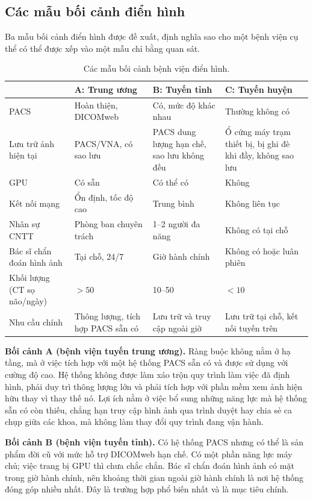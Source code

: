 \subsection{Các mẫu bối cảnh điển hình}

Ba mẫu bối cảnh điển hình được đề xuất, định nghĩa sao cho một bệnh viện cụ thể
có thể được xếp vào một mẫu chỉ bằng quan sát.

\begin{table}[H]
\centering
\small
\begin{tabularx}{\textwidth}{@{}l X X X@{}}
\toprule
 & \textbf{A: Trung ương} & \textbf{B: Tuyến tỉnh} & \textbf{C: Tuyến huyện} \\
\midrule
PACS & Hoàn thiện, DICOMweb & Có, mức độ khác nhau & Thường không có \\
Lưu trữ ảnh hiện tại & PACS/VNA, có sao lưu & PACS dung lượng hạn chế, sao lưu không đều & Ổ cứng máy trạm thiết bị, bị ghi đè khi đầy, không sao lưu \\
GPU & Có sẵn & Có thể có & Không \\
Kết nối mạng & Ổn định, tốc độ cao & Trung bình & Không liên tục \\
Nhân sự CNTT & Phòng ban chuyên trách & 1--2 người đa năng & Không có tại chỗ \\
Bác sĩ chẩn đoán hình ảnh & Tại chỗ, 24/7 & Giờ hành chính & Không có hoặc luân phiên \\
Khối lượng (CT sọ não/ngày) & $>50$ & 10--50 & $<10$ \\
Nhu cầu chính & Thông lượng, tích hợp PACS sẵn có & Lưu trữ và truy cập ngoài giờ & Lưu trữ tại chỗ, kết nối tuyến trên \\
\bottomrule
\end{tabularx}
\caption{Các mẫu bối cảnh bệnh viện điển hình.}
\label{tab:contexts}
\end{table}

\textbf{Bối cảnh A (bệnh viện tuyến trung ương).} Ràng buộc không nằm ở hạ
tầng, mà ở việc tích hợp với một hệ thống PACS sẵn có và được sử dụng với cường
độ cao. Hệ thống không được làm xáo trộn quy trình làm việc đã định hình, phải
duy trì thông lượng lớn và phải tích hợp với phần mềm xem ảnh hiện hữu thay vì
thay thế nó. Lợi ích nằm ở việc bổ sung những năng lực mà hệ thống sẵn có còn
thiếu, chẳng hạn truy cập hình ảnh qua trình duyệt hay chia sẻ ca chụp giữa các
khoa, mà không làm thay đổi quy trình đang vận hành.

\textbf{Bối cảnh B (bệnh viện tuyến tỉnh).} Có hệ thống PACS nhưng có thể là
sản phẩm đời cũ với mức hỗ trợ DICOMweb hạn chế. Có một phần năng lực máy chủ;
việc trang bị GPU thì chưa chắc chắn. Bác sĩ chẩn đoán hình ảnh có mặt trong
giờ hành chính, nên khoảng thời gian ngoài giờ hành chính là nơi hệ thống đóng
góp nhiều nhất. Đây là trường hợp phổ biến nhất và là mục tiêu chính.

